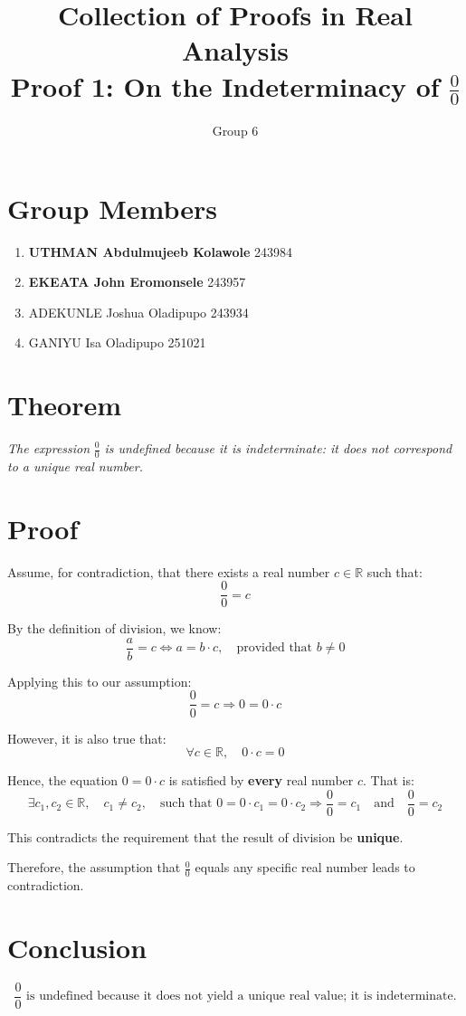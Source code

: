 \documentclass[12pt]{article}
\title{Collection of Proofs in Real Analysis \\ \large Proof 1: On the Indeterminacy of \texorpdfstring{$\frac{0}{0}$}{0/0}}
\author{Group 6}
\date{}
\begin{document}
\section*{Group Members}
\begin{enumerate}[label=\arabic*.]
    \item \textbf{UTHMAN Abdulmujeeb Kolawole} \hfill 243984
    \item \textbf{EKEATA John Eromonsele} \hfill 243957
    \item ADEKUNLE Joshua Oladipupo \hfill 243934
    \item GANIYU Isa Oladipupo \hfill 251021
\end{enumerate}

\section*{Theorem}
\textit{The expression} \( \frac{0}{0} \) \textit{is undefined because it is indeterminate: it does not correspond to a unique real number.}

\section*{Proof}

Assume, for contradiction, that there exists a real number \( c \in \mathbb{R} \) such that:
\[
\frac{0}{0} = c
\]

By the definition of division, we know:
\begin{equation*}
\frac{a}{b} = c \iff a = b \cdot c, \quad \text{provided that } b \neq 0
\end{equation*}

Applying this to our assumption:
\begin{equation*}
\frac{0}{0} = c \Rightarrow 0 = 0 \cdot c
\end{equation*}

However, it is also true that:
\begin{equation*}
\forall c \in \mathbb{R},\quad 0 \cdot c = 0
\end{equation*}

Hence, the equation \( 0 = 0 \cdot c \) is satisfied by \textbf{every} real number \( c \). That is:
\begin{equation*}
\exists c_1, c_2 \in \mathbb{R},\quad c_1 \ne c_2,\quad \text{such that } 0 = 0 \cdot c_1 = 0 \cdot c_2
\Rightarrow \frac{0}{0} = c_1 \quad \text{and} \quad \frac{0}{0} = c_2
\end{equation*}

This contradicts the requirement that the result of division be \textbf{unique}.

\medskip

\noindent Therefore, the assumption that \( \frac{0}{0} \) equals any specific real number leads to contradiction.

\section*{Conclusion}

\begin{equation*}
\boxed{
\frac{0}{0} \text{ is undefined because it does not yield a unique real value; it is indeterminate.}
}
\end{equation*}
\end{document}

